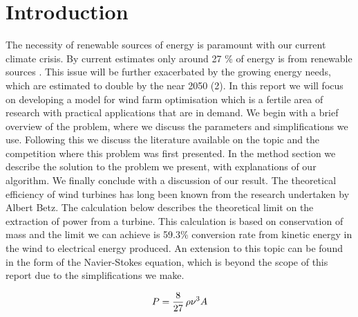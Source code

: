\documentclass{Academic}
\begin{document}
\myabstract{}
\renewcommand{\myTitle}{Wind farm layout optimisation using a genetic algorithm
}
\renewcommand{\MyAuthor}{Ryan Shaw $^{1}$, Bharath Shivamogga-Jairam$^{2}$, Filip Tobolewski$^{3}$, Mingting Hong$^{4}$, Arif Malik$^{5}$}
\renewcommand{\MyDepartment}{Department of Computer Science}

\maketitle
\onehalfspacing

\section{Introduction}

The necessity of renewable sources of energy is paramount with our current climate crisis. By current estimates only around 27 {\%} of energy is from renewable sources \supercite{einstein}. This issue will be further exacerbated by the growing energy needs, which are estimated to double by the near 2050 (2). In this report we will focus on developing a model for wind farm optimisation which is a fertile area of research with practical applications that are in demand. We begin with a brief overview of the problem, where we discuss the parameters and simplifications we use. Following this we discuss the literature available on the topic and the competition where this problem was first presented. In the method section we describe the solution to the problem we present, with explanations of our algorithm. We finally conclude with a discussion of our result.
The theoretical efficiency of wind turbines has long been known from the research undertaken by Albert Betz. The calculation below describes the theoretical limit on the extraction of power from a turbine. This calculation is based on conservation of mass and the limit we can achieve is 59.3{\%} conversion rate from kinetic energy in the wind to electrical energy produced. An extension to this topic can be found in the form of the Navier-Stokes equation, which is beyond the scope of this report due to the simplifications we make.

\[P=\frac{8}{27} \thinspace \rho \nu {^3}A\]
\end{document}

